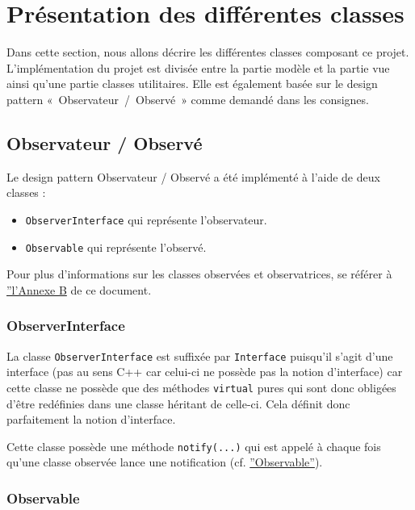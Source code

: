 \documentclass[]{article}
\begin{document}
\newpage
\section{Présentation des différentes classes}

Dans cette section, nous allons décrire les différentes classes
composant ce projet.
L’implémentation du projet est divisée entre la partie modèle et la partie vue ainsi 
qu'une partie classes utilitaires.
Elle est également basée sur le design pattern «~Observateur~/~Observé~» comme demandé
dans les consignes. 

\subsection{\label{OO}Observateur / Observé}

Le design pattern Observateur / Observé a été implémenté à l'aide de deux classes : 

\begin{itemize}
    \item \texttt{ObserverInterface} qui représente l'observateur.
    \item \texttt{Observable} qui représente l'observé.
\end{itemize}

Pour plus d'informations sur les classes observées et observatrices, se référer à
\hyperref[AnnexeB]{''l'Annexe B} de ce document.

\subsubsection{ObserverInterface}

La classe \texttt{ObserverInterface} est suffixée par \texttt{Interface} puisqu'il
s'agit d'une interface (pas au sens C++ car celui-ci ne possède pas la notion
d'interface) car cette classe ne possède que des méthodes \texttt{virtual} pures
qui sont donc obligées d'être redéfinies dans une classe héritant de celle-ci.
Cela définit donc parfaitement la notion d'interface.

Cette classe possède une méthode \texttt{notify(...)} qui est appelé à chaque fois
qu'une classe observée lance une notification (cf. \hyperref[Observable]{''Observable''}).

\subsubsection{\label{Observable}Observable}
\end{document}
